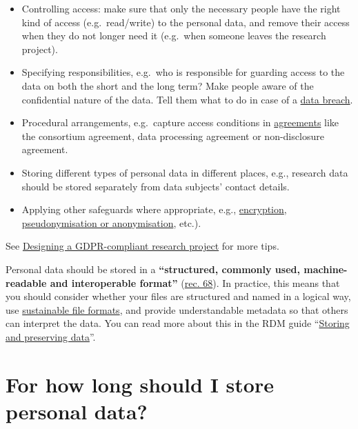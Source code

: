 \documentclass[
]{book}
\providecommand{\tightlist}{%
  \setlength{\itemsep}{0pt}\setlength{\parskip}{0pt}}
\begin{document}
\begin{itemize}
\tightlist
\item
  Controlling access: make sure that only the necessary people have the right
  kind of access (e.g.~read/write) to the personal data, and remove their access
  when they do not longer need it (e.g.~when someone leaves the research project).\\
\item
  Specifying responsibilities, e.g.~who is responsible for guarding access to the
  data on both the short and the long term? Make people aware of the confidential
  nature of the data. Tell them what to do in case of a
  \href{https://intranet.uu.nl/en/knowledgebase/what-is-a-personal-data-breach}{data breach}.
\item
  Procedural arrangements, e.g.~capture access conditions in
  \protect\hyperlink{agreements}{agreements} like the consortium agreement, data processing
  agreement or non-disclosure agreement.
\item
  Storing different types of personal data in different places, e.g., research
  data should be stored separately from data subjects' contact details.
\item
  Applying other safeguards where appropriate, e.g., \protect\hyperlink{encryption}{encryption},
  \protect\hyperlink{pseudonymisation-anonymisation}{pseudonymisation or anonymisation}, etc.).
\end{itemize}

See \protect\hyperlink{privacy-by-design}{Designing a GDPR-compliant research project} for more tips.

Personal data should be stored in a \textbf{``structured, commonly used, machine-readable
and interoperable format''} (\href{https://gdpr.eu/Recital-68-Right-of-data-portability/}{rec. 68}).
In practice, this means that you should consider whether your files are
structured and named in a logical way, use
\href{https://dans.knaw.nl/en/file-formats/}{sustainable file formats},
and provide understandable metadata so that others can interpret the data.
You can read more about this in the RDM guide
``\href{https://www.uu.nl/en/research/research-data-management/guides/storing-and-preserving-data}{Storing and preserving data}''.

\hypertarget{data-storage-duration}{%
\section{For how long should I store personal data?}\label{data-storage-duration}}
\end{document}

